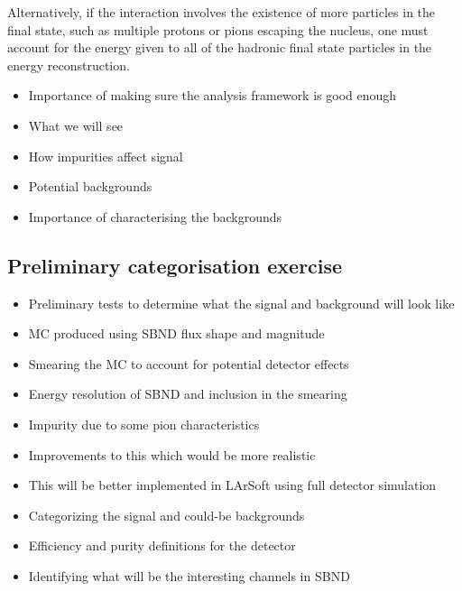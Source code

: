 Alternatively, if the interaction involves the existence of more particles in the final state, such as multiple protons or pions escaping the nucleus, one must account for the energy given to all of the hadronic final state particles in the energy reconstruction. 


    \begin{itemize}
        \item Importance of making sure the analysis framework is good enough
        \item What we will see
        \item How impurities affect signal
        \item Potential backgrounds 
        \item Importance of characterising the backgrounds
    \end{itemize}

\subsection{Preliminary categorisation exercise}
    
    \begin{itemize}
        \item Preliminary tests to determine what the signal and background will look like
        \item MC produced using SBND flux shape and magnitude 
        \item Smearing the MC to account for potential detector effects
        \item Energy resolution of SBND and inclusion in the smearing
        \item Impurity due to some pion characteristics
        \item Improvements to this which would be more realistic
        \item This will be better implemented in LArSoft using full detector simulation
        \item Categorizing the signal and could-be backgrounds
        \item Efficiency and purity definitions for the detector
        \item Identifying what will be the interesting channels in SBND
    \end{itemize}


\clearpage
